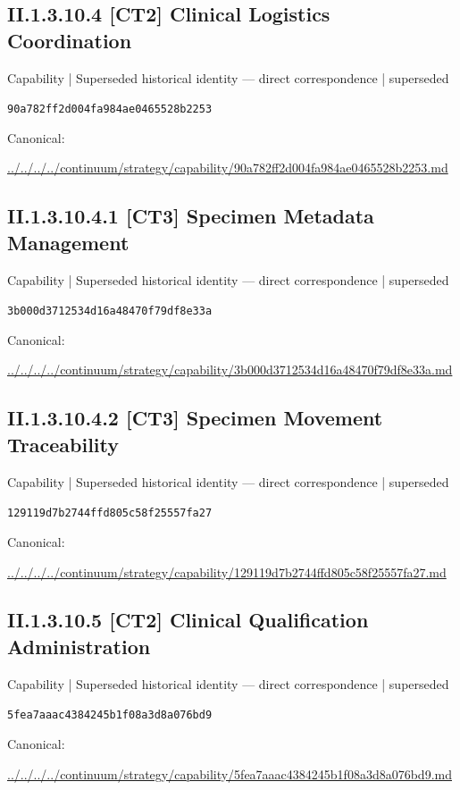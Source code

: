 \documentclass[10pt,a4paper]{article}
\begin{document}
\subsection*{II.1.3.10.4 [CT2] Clinical Logistics Coordination}
{\small Capability | Superseded historical identity — direct correspondence | superseded}\par
\texttt{90a782ff2d004fa984ae0465528b2253}\par
Canonical: \par
{\footnotesize\url{../../../../continuum/strategy/capability/90a782ff2d004fa984ae0465528b2253.md}}\par
\subsection*{II.1.3.10.4.1 [CT3] Specimen Metadata Management}
{\small Capability | Superseded historical identity — direct correspondence | superseded}\par
\texttt{3b000d3712534d16a48470f79df8e33a}\par
Canonical: \par
{\footnotesize\url{../../../../continuum/strategy/capability/3b000d3712534d16a48470f79df8e33a.md}}\par
\subsection*{II.1.3.10.4.2 [CT3] Specimen Movement Traceability}
{\small Capability | Superseded historical identity — direct correspondence | superseded}\par
\texttt{129119d7b2744ffd805c58f25557fa27}\par
Canonical: \par
{\footnotesize\url{../../../../continuum/strategy/capability/129119d7b2744ffd805c58f25557fa27.md}}\par
\subsection*{II.1.3.10.5 [CT2] Clinical Qualification Administration}
{\small Capability | Superseded historical identity — direct correspondence | superseded}\par
\texttt{5fea7aaac4384245b1f08a3d8a076bd9}\par
Canonical: \par
{\footnotesize\url{../../../../continuum/strategy/capability/5fea7aaac4384245b1f08a3d8a076bd9.md}}\par
\end{document}
